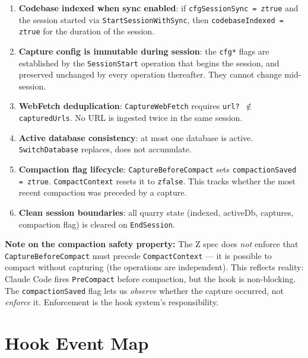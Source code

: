 \documentclass[a4paper,10pt,fleqn]{article}
\begin{document}
\begin{enumerate}
  \item \textbf{Codebase indexed when sync enabled}: if
    \texttt{cfgSessionSync = ztrue} and the session started via
    \texttt{StartSessionWithSync}, then
    \texttt{codebaseIndexed = ztrue} for the duration of the session.

  \item \textbf{Capture config is immutable during session}: the
    \texttt{cfg*} flags are established by the \texttt{SessionStart}
    operation that begins the session, and preserved unchanged by every
    operation thereafter. They cannot change mid-session.

  \item \textbf{WebFetch deduplication}: \texttt{CaptureWebFetch}
    requires \texttt{url? $\notin$ capturedUrls}. No URL is ingested
    twice in the same session.

  \item \textbf{Active database consistency}: at most one database
    is active. \texttt{SwitchDatabase} replaces, does not accumulate.

  \item \textbf{Compaction flag lifecycle}:
    \texttt{CaptureBeforeCompact} sets \texttt{compactionSaved = ztrue}.
    \texttt{CompactContext} resets it to \texttt{zfalse}. This tracks
    whether the most recent compaction was preceded by a capture.

  \item \textbf{Clean session boundaries}: all quarry state
    (indexed, activeDb, captures, compaction flag) is cleared on
    \texttt{EndSession}.
\end{enumerate}

\textbf{Note on the compaction safety property:} The Z spec does
\emph{not} enforce that \texttt{CaptureBeforeCompact} must precede
\texttt{CompactContext} --- it is possible to compact without
capturing (the operations are independent). This reflects reality:
Claude Code fires \texttt{PreCompact} before compaction, but the
hook is non-blocking. The \texttt{compactionSaved} flag lets us
\emph{observe} whether the capture occurred, not \emph{enforce} it.
Enforcement is the hook system's responsibility.

\section{Hook Event Map}
\end{document}
